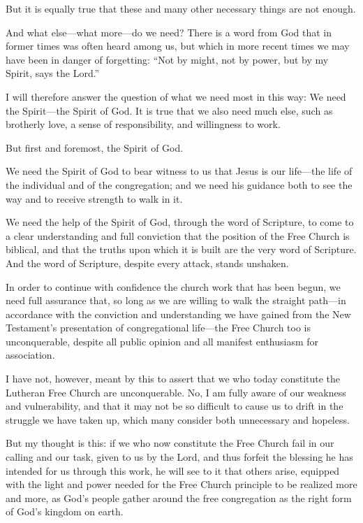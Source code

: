 But it is equally true that these and many other necessary things are not enough.

And what else—what more—do we need? There is a word from God that in former times was often heard among us, but which in more recent times we may have been in danger of forgetting: “Not by might, not by power, but by my Spirit, says the Lord.”

I will therefore answer the question of what we need most in this way: We need the Spirit—the Spirit of God. It is true that we also need much else, such as brotherly love, a sense of responsibility, and willingness to work.

But first and foremost, the Spirit of God.

We need the Spirit of God to bear witness to us that Jesus is our life—the life of the individual and of the congregation; and we need his guidance both to see the way and to receive strength to walk in it.

We need the help of the Spirit of God, through the word of Scripture, to come to a clear understanding and full conviction that the position of the Free Church is biblical, and that the truths upon which it is built are the very word of Scripture. And the word of Scripture, despite every attack, stands unshaken.

In order to continue with confidence the church work that has been begun, we need full assurance that, so long as we are willing to walk the straight path—in accordance with the conviction and understanding we have gained from the New Testament’s presentation of congregational life—the Free Church too is unconquerable, despite all public opinion and all manifest enthusiasm for association.

I have not, however, meant by this to assert that we who today constitute the Lutheran Free Church are unconquerable. No, I am fully aware of our weakness and vulnerability, and that it may not be so difficult to cause us to drift in the struggle we have taken up, which many consider both unnecessary and hopeless.

But my thought is this: if we who now constitute the Free Church fail in our calling and our task, given to us by the Lord, and thus forfeit the blessing he has intended for us through this work, he will see to it that others arise, equipped with the light and power needed for the Free Church principle to be realized more and more, as God’s people gather around the free congregation as the right form of God’s kingdom on earth.

